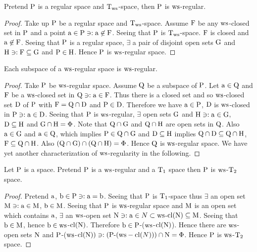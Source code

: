 \begin{thm}\label{thm8.3.3}
Pretend $\mathrm{P}$ is a regular space and $\mathrm{T}_{\mathrm{ws}}$-space, then $\mathrm{P}$ is $\mathrm{ws}$-regular.
\end{thm}

\begin{proof}
Take up $\mathrm{P}$ be a regular space and $\mathrm{T}_{\mathrm{ws}}$-space. Assume $\mathrm{F}$ be any $\mathrm{ws}$-closed set in $\mathrm{P}$ and a point $\mathrm{a} \in \mathrm{P} \ni: \mathrm{a}\not\in \mathrm{F}$. Seeing that $\mathrm{P}$ is $\mathrm{T}_{\mathrm{ws}}$-space. $\mathrm{F}$ is closed and $\mathrm{a} \not\in \mathrm{F}$. Seeing that $\mathrm{P}$ is a regular space, $\exists$ a pair of disjoint open sets $\mathrm{G}$ and $\mathrm{H} \ni: \mathrm{F} \subseteq \mathrm{G}$ and $\mathrm{P} \in \mathrm{H}$. Hence $\mathrm{P}$ is $\mathrm{ws}$-regular space.
\end{proof}

\begin{thm}\label{thm8.3.4}
Each subspace of a $\mathrm{ws}$-regular space is $\mathrm{ws}$-regular.
\end{thm}

\begin{proof}
Take $\mathrm{P}$ be $\mathrm{ws}$-regular space. Assume $\mathrm{Q}$ be a subspace of $\mathrm{P}$. Let $\mathrm{a} \in \mathrm{Q}$ and $\mathrm{F}$ be a $\mathrm{ws}$-closed set in $\mathrm{Q} \ni: \mathrm{a} \in \mathrm{F}$. Thus there is a closed set and so $\mathrm{ws}$-closed set $\mathrm{D}$ of $\mathrm{P}$ with $\mathrm{F} = \mathrm{Q} \cap \mathrm{D}$ and $\mathrm{P} \in \mathrm{D}$. Therefore we have $\mathrm{a} \in \mathrm{P}$, $\mathrm{D}$ is $\mathrm{ws}$-closed in $\mathrm{P} \ni: \mathrm{a} \in \mathrm{D}$. Seeing that $\mathrm{P}$ is $\mathrm{ws}$-regular, $\exists$  open sets $\mathrm{G}$ and $\mathrm{H} \ni: \mathrm{a} \in \mathrm{G}$, $\mathrm{D}\subseteq \mathrm{H}$ and $\mathrm{G} \cap \mathrm{H} = \Phi$. Note that $\mathrm{Q} \cap \mathrm{G}$ and $\mathrm{Q} \cap \mathrm{H}$ are open sets in $\mathrm{Q}$. Also $\mathrm{a} \in \mathrm{G}$ and $\mathrm{a} \in \mathrm{Q}$, which implies $\mathrm{P} \in \mathrm{Q} \cap \mathrm{G}$ and $\mathrm{D} \subseteq \mathrm{H}$ implies $\mathrm{Q} \cap \mathrm{D} \subseteq \mathrm{Q} \cap \mathrm{H}$, $\mathrm{F} \subseteq \mathrm{Q} \cap \mathrm{H}$. Also $(\mathrm{Q} \cap \mathrm{G}) \cap (\mathrm{Q} \cap \mathrm{H}) = \Phi$. Hence $\mathrm{Q}$ is $\mathrm{ws}$-regular space. We have yet another characterization of $\mathrm{ws}$-regularity in the following.
\end{proof}

\begin{thm}\label{thm8.3.5}
Let $\mathrm{P}$ is a space. Pretend $\mathrm{P}$ is a $\mathrm{ws}$-regular and a $\mathrm{T}_{1}$ space then $\mathrm{P}$ is $\mathrm{ws}$-$\mathrm{T}_{2}$ space.
\end{thm}

\begin{proof}
Pretend $\mathrm{a}$, $\mathrm{b} \in \mathrm{P} \ni: \mathrm{a} = \mathrm{b}$. Seeing that $\mathrm{P}$ is $\mathrm{T}_{1}$-space thus $\exists$ an open set $\mathrm{M} \ni:\mathrm{a} \in \mathrm{M}$, $\mathrm{b} \in \mathrm{M}$. Seeing that $\mathrm{P}$ is $\mathrm{ws}$-regular space and $\mathrm{M}$ is an open set which contains $\mathrm{a}$, $\exists$  an $\mathrm{ws}$-open set $\mathrm{N} \ni: \mathrm{a}\in N\subset \mathrm{ws}$-$\mathrm{cl}(\mathrm{N}) \subseteq \mathrm{M}$. Seeing that $\mathrm{b} \in \mathrm{M}$, hence $\mathrm{b} \in \mathrm{ws}$-$\mathrm{cl}(\mathrm{N})$. Therefore $\mathrm{b} \in \mathrm{P}$-($\mathrm{ws}$-$\mathrm{cl}(\mathrm{N})$). Hence there are $\mathrm{ws}$-open sets $\mathrm{N}$ and $\mathrm{P}$-($\mathrm{ws}$-$\mathrm{cl}(\mathrm{N})) \ni:(\mathrm{P}\text{-}(\mathrm{ws}-\mathrm{cl}(N)))\cap \mathrm{N} = \Phi$. Hence $\mathrm{P}$ is $\mathrm{ws}$-$\mathrm{T}_{2}$ space.
\end{proof}

